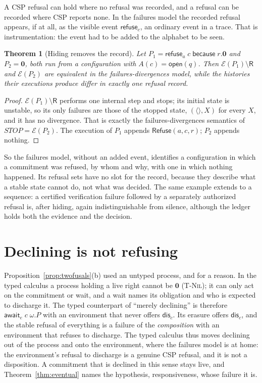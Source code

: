 \documentclass[11pt,openany]{book}
\newtheorem{theorem}{Theorem}[chapter]
\theoremstyle{remark}
\newcommand{\Refuse}{\mathsf{Refuse}}
\begin{document}
A CSP refusal can hold where no refusal was recorded, and a refusal can be
recorded where CSP reports none. In the failures model the recorded
refusal appears, if at all, as the visible event $\mathsf{refuse}_c$, an
ordinary event in a trace. That is instrumentation: the event had to be
added to the alphabet to be seen.

\begin{theorem}[Hiding removes the record]\label{thm:csp}
Let $P_1=\mathsf{refuse}_a\;c\;\mathsf{because}\;r.\mathbf 0$ and
$P_2=\mathbf 0$, both run from a configuration with
$A(c)=\mathsf{open}(q)$. Then $\mathcal E(P_1)\setminus\mathsf R$ and
$\mathcal E(P_2)$ are equivalent in the failures-divergences model, while
the histories their executions produce differ in exactly one refusal
record.
\end{theorem}

\begin{proof}
$\mathcal E(P_1)\setminus\mathsf R$ performs one internal step and stops;
its initial state is unstable, so its only failures are those of the
stopped state, $(\langle\rangle,X)$ for every $X$, and it has no
divergence. That is exactly the failures-divergences semantics of
$\mathit{STOP}=\mathcal E(P_2)$. The execution of $P_1$ appends
$\Refuse(a,c,r)$; $P_2$ appends nothing.
\end{proof}

So the failures model, without an added event, identifies a configuration
in which a commitment was refused, by whom and why, with one in which
nothing happened. Its refusal sets have no slot for the record, because
they describe what a stable state cannot do, not what was decided. The
same example extends to a sequence: a certified verification failure
followed by a separately authorized refusal is, after hiding, again
indistinguishable from silence, although the ledger holds both the
evidence and the decision.

\section{Declining is not refusing}

Proposition~\ref{prop:twofusals}(b) used an untyped process, and for a
reason. In the typed calculus a process holding a live right cannot be
$\mathbf 0$ (\textsc{T-Nil}); it can only act on the commitment or wait,
and a wait names its obligation and who is expected to discharge it. The
typed counterpart of ``merely declining'' is therefore
$\mathsf{await}_e\;c\;\omega.P$ with an environment that never offers
$\mathsf{dis}_c$. Its erasure offers $\mathsf{dis}_c$, and the stable
refusal of everything is a failure of the \emph{composition} with an
environment that refuses to discharge. The typed calculus thus moves
declining out of the process and onto the environment, where the failures
model is at home: the environment's refusal to discharge is a genuine CSP
refusal, and it is not a disposition. A commitment that is declined in
this sense stays live, and Theorem~\ref{thm:eventual} names the hypothesis,
responsiveness, whose failure it is.
\end{document}
